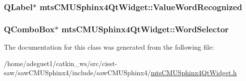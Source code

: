 \hypertarget{classmts_c_m_u_sphinx4_qt_widget_a2fb5f8ac612123f74c38a522309ecf80}{
\subsubsection[{Value\-Word\-Recognized}]{\setlength{\rightskip}{0pt plus 5cm}Q\-Label$\ast$ mts\-C\-M\-U\-Sphinx4\-Qt\-Widget\-::\-Value\-Word\-Recognized}}\label{classmts_c_m_u_sphinx4_qt_widget_a2fb5f8ac612123f74c38a522309ecf80}
\hypertarget{classmts_c_m_u_sphinx4_qt_widget_a3d6acb7e4e230bd1b0b3ca90aba15522}{
\subsubsection[{Word\-Selector}]{\setlength{\rightskip}{0pt plus 5cm}Q\-Combo\-Box$\ast$ mts\-C\-M\-U\-Sphinx4\-Qt\-Widget\-::\-Word\-Selector}}\label{classmts_c_m_u_sphinx4_qt_widget_a3d6acb7e4e230bd1b0b3ca90aba15522}


The documentation for this class was generated from the following file\-:\begin{DoxyCompactItemize}
\item 
/home/adeguet1/catkin\-\_\-ws/src/cisst-\/saw/saw\-C\-M\-U\-Sphinx4/include/saw\-C\-M\-U\-Sphinx4/\hyperlink{mts_c_m_u_sphinx4_qt_widget_8h}{mts\-C\-M\-U\-Sphinx4\-Qt\-Widget.\-h}\end{DoxyCompactItemize}
